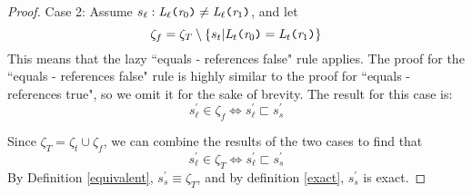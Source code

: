 \begin{proof}
Case 2: Assume $s_\ell : \emph{L}_\ell \texttt{(} \emph{r}_0\texttt{)} \neq \emph{L}_\ell \texttt{(} \emph{r}_1 \texttt{)}$, and let 
$$\zeta_f = \zeta_T \setminus \{ s_t | \emph{L}_t \texttt{(} \emph{r}_0\texttt{)} = \emph{L}_t \texttt{(} \emph{r}_1 \texttt{)} \}$$ 
This means that the lazy ``equals - references false" rule applies. The proof for the ``equals - references false" rule is highly similar to the proof for ``equals - references true", so we omit it for the sake of brevity. The result for this case is:
$$s_\ell^\prime \in \zeta_f \Leftrightarrow s_\ell^\prime \sqsubset s_s^\prime$$

Since $\zeta_T = \zeta_t \cup \zeta_f$, we can combine the results of the two cases to find that 
$$s_\ell^\prime \in \zeta_T \Leftrightarrow s_\ell^\prime \sqsubset s_s^\prime$$
 By Definition \ref{equivalent}, $s_s^\prime \equiv \zeta_T$, and by definition \ref{exact}, $s_s^\prime$ is exact.
\end{proof}


